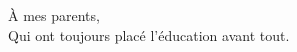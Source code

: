 
\thispagestyle{empty}


\vspace*{3cm}


\bigskip

\begin{center}
    \`A mes parents, \\ \smallskip
    Qui ont toujours plac\'e l'\'education avant tout.
\end{center}
